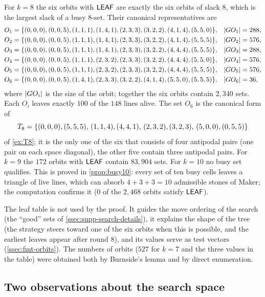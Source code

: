 For $k=8$ the six orbits with $\mathsf{LEAF}$ are exactly the six orbits of slack $8$, which is the largest slack
of a busy $8$-set. Their canonical representatives are
\begin{align*}
O_1&=\{(0,0,0),(0,0,5),(1,1,1),(1,4,1),(2,3,3),(3,2,2),(4,1,4),(5,5,0)\}, & |G O_1|&=288,\\
O_2&=\{(0,0,0),(0,0,5),(1,1,1),(1,4,1),(2,3,3),(3,2,2),(4,1,4),(5,5,5)\}, & |G O_2|&=576,\\
O_3&=\{(0,0,0),(0,0,5),(1,1,1),(1,4,1),(2,3,3),(3,2,2),(4,4,4),(5,5,5)\}, & |G O_3|&=288,\\
O_4&=\{(0,0,0),(0,0,5),(1,1,1),(2,3,2),(2,3,3),(3,2,2),(4,4,4),(5,5,0)\}, & |G O_4|&=576,\\
O_5&=\{(0,0,0),(0,0,5),(1,1,1),(2,3,2),(2,3,3),(3,2,2),(4,4,4),(5,5,5)\}, & |G O_5|&=576,\\
O_6&=\{(0,0,0),(0,0,5),(1,4,1),(2,3,3),(3,2,2),(4,1,4),(5,5,0),(5,5,5)\}, & |G O_6|&=36,
\end{align*}
where $|G O_i|$ is the size of the orbit; together the six orbits contain $2{,}340$ sets. Each $O_i$
leaves exactly $100$ of the $148$ lines alive. The set $O_6$ is the canonical form of
\[
T_8=\{(0,0,0),(5,5,5),\,(1,1,4),(4,4,1),\,(2,3,2),(3,2,3),\,(5,0,0),(0,5,5)\}
\]
of \cref{ex:T8}; it is the only one of the six that consists of four antipodal pairs (one pair on each
space diagonal), the other five contain three antipodal pairs. For $k=9$ the $172$ orbits with $\mathsf{LEAF}$
contain $83{,}904$ sets. For $k=10$ no busy set qualifies. This is proved in \cref{prop:busy10}: every
set of ten busy cells leaves a triangle of live lines, which can absorb $4+3+3=10$ admissible stones of
Maker; the computation confirms it ($0$ of the $2{,}468$ orbits satisfy $\mathsf{LEAF}$).

The leaf table is not used by the proof. It guides the move ordering of the search (the ``good'' sets
of \cref{ssec:supp-search-details}), it explains the shape of the tree (the strategy steers toward one of the six
orbits when this is possible, and the earliest leaves appear after round $8$), and its values serve as
test vectors (\cref{ssec:fmt-orbits}). The numbers of orbits ($527$ for $k=7$ and the three values in the
table) were obtained both by Burnside's lemma and by direct enumeration.

\subsection{Two observations about the search space}\label{ssec:observations}

